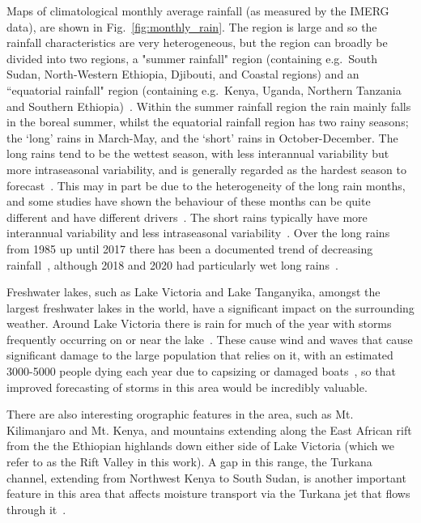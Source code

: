 \documentclass[../main.tex]{subfiles}
\begin{document}
Maps of climatological monthly average rainfall (as measured by the IMERG data), are shown in Fig.~\ref{fig:monthly_rain}. The region is large and so the rainfall characteristics are very heterogeneous, but the region can broadly be divided into two regions, a "summer rainfall" region (containing e.g.~South Sudan, North-Western Ethiopia, Djibouti, and Coastal regions) and an ``equatorial rainfall" region (containing e.g.~Kenya, Uganda, Northern Tanzania and Southern Ethiopia)~\citep{nicholson_climate_2017}. Within the summer rainfall region the rain mainly falls in the boreal summer, whilst the equatorial rainfall region has two rainy seasons; the `long' rains in March-May, and the `short' rains in October-December. The long rains tend to be the wettest season, with less interannual variability but more intraseasonal variability, and is generally regarded as the hardest season to forecast~\citep{nicholson_climate_2017, walker_skill_2019, kilavi_extreme_2018}. This may in part be due to the heterogeneity of the long rain months, and some studies have shown the behaviour of these months can be quite different and have different drivers~\citep{camberlin_east_2002}. The short rains typically have more interannual variability and less intraseasonal variability~\citep{black_observational_2003}. Over the long rains from 1985 up until 2017 there has been a documented trend of decreasing rainfall~\citep{wainwright_eastern_2019, liebmann_understanding_2014}, although 2018 and 2020 had particularly wet long rains~\citep{palmer_drivers_2023}.

Freshwater lakes, such as Lake Victoria and Lake Tanganyika, amongst the largest freshwater lakes in the world, have a significant impact on the surrounding weather. Around Lake Victoria there is rain for much of the year with storms frequently occurring on or near the lake~\citep{macleod_drivers_2021, chamberlain_forecasting_2014, woodhams_identifying_2019}. These cause wind and waves that cause significant damage to the large population that relies on it, with an estimated 3000-5000 people dying each year due to capsizing or damaged boats~\citep{ifrc_world_2014}, so that improved forecasting of storms in this area would be incredibly valuable. 

There are also interesting orographic features in the area, such as Mt. Kilimanjaro and Mt. Kenya, and mountains extending along the East African rift from the the Ethiopian highlands down either side of Lake Victoria (which we refer to as the Rift Valley in this work). A gap in this range, the Turkana channel, extending from Northwest Kenya to South Sudan, is another important feature in this area that affects moisture transport via the Turkana jet that flows through it~\citep{nicholson_turkana_2016}.
\end{document}
